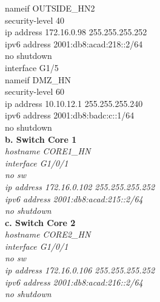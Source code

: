 \documentclass[12pt,a4paper]{report}
\begin{document}
{\hspace*{2cm}nameif OUTSIDE\_HN2\\
\hspace*{2cm}security-level 40\\
\hspace*{2cm}ip address 172.16.0.98 255.255.255.252\\
\hspace*{2cm}ipv6 address 2001:db8:acad:218::2/64\\
\hspace*{2cm}no shutdown\\
\hspace*{2cm}interface G1/5\\
\hspace*{2cm}nameif DMZ\_HN\\
\hspace*{2cm}security-level 60\\
\hspace*{2cm}ip address 10.10.12.1 255.255.255.240\\
\hspace*{2cm}ipv6 address 2001:db8:badc:c::1/64\\
\hspace*{2cm}no shutdown\\}
\hspace*{1cm}\textbf{b. Switch Core 1}\\
\hspace*{2cm}\textit{hostname CORE1\_HN\\
\hspace*{2cm}interface G1/0/1\\
\hspace*{2cm}no sw\\
\hspace*{2cm}ip address 172.16.0.102 255.255.255.252\\
\hspace*{2cm}ipv6 address 2001:db8:acad:215::2/64\\
\hspace*{2cm}no shutdown\\}
\hspace*{1cm}\textbf{c. Switch Core 2}\\
\hspace*{2cm}\textit{hostname CORE2\_HN\\
\hspace*{2cm}interface G1/0/1\\
\hspace*{2cm}no sw\\
\hspace*{2cm}ip address 172.16.0.106 255.255.255.252\\
\hspace*{2cm}ipv6 address 2001:db8:acad:216::2/64\\
\hspace*{2cm}no shutdown\\}
\end{document}
